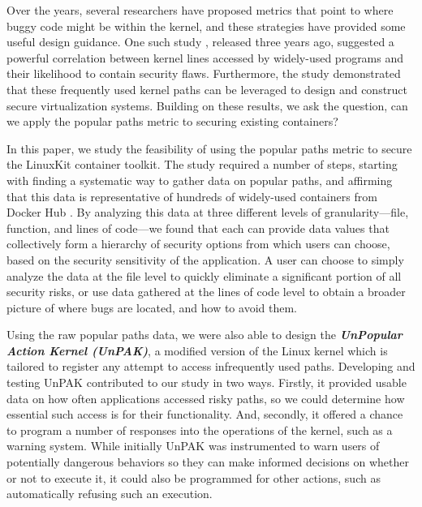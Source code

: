 Over the years, several  researchers \cite{Chou, Ozment} have proposed metrics that point to where buggy code might be within the kernel, 
and these strategies have provided some useful  design guidance. 
One such study \cite{Lock-in-Pop}, released three years ago, suggested a powerful correlation between kernel lines accessed by widely-used programs and their likelihood to contain security flaws. 
Furthermore, the study \cite{Lock-in-Pop} demonstrated that these frequently used kernel paths can be leveraged to design and construct secure virtualization systems. 
Building on these results, we ask the question, can we apply the popular paths metric to  securing existing containers? 

In this paper, we study the feasibility of using the popular paths metric to secure the LinuxKit container toolkit. 
The study required a number of steps, starting with finding a  systematic way to gather data on popular paths, 
and affirming that this data is representative of hundreds of widely-used containers from Docker Hub \cite{DockerHub}. 
By analyzing this data at three different levels of granularity—file, function, and lines of code—we found that 
each can provide data values that collectively form a hierarchy of security options from which users can choose, 
based on the security sensitivity of the application. A user can choose to simply analyze the data at the file level to quickly eliminate a significant portion of all security risks, 
or use data gathered at the lines of code level to obtain a broader picture of where bugs are located, and how to avoid them.

Using the raw popular paths data, we were also able to design the \textbf{\textit{UnPopular Action Kernel (UnPAK)}}, 
a modified version of the Linux kernel which is tailored to register any attempt to access infrequently used paths. 
Developing and testing UnPAK contributed to our study in two ways. 
Firstly, it provided usable data on how often applications accessed risky paths, so we could determine how essential such access is for their functionality. 
And, secondly, it offered a chance to program a number of responses into the operations of the kernel, such as a warning system. 
While initially UnPAK  was instrumented to warn users of potentially dangerous behaviors so they can make informed decisions on whether or not to execute it, 
it could also be programmed for other actions, such as automatically refusing such an execution.


